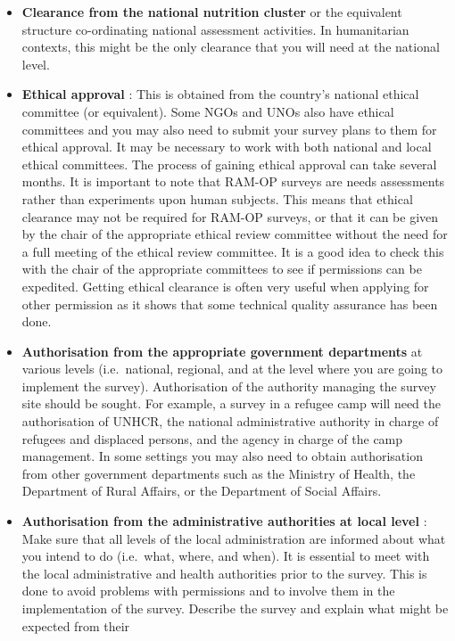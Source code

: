 \documentclass[12pt,a4paper]{book}
\theoremstyle{definition}
\theoremstyle{definition}
\theoremstyle{definition}
\theoremstyle{remark}
\begin{document}
\begin{itemize}
\item
  \textbf{Clearance from the national nutrition cluster} or the
  equivalent structure co-ordinating national assessment activities. In
  humanitarian contexts, this might be the only clearance that you will
  need at the national level.
\item
  \textbf{Ethical approval} : This is obtained from the country's
  national ethical committee (or equivalent). Some NGOs and UNOs also
  have ethical committees and you may also need to submit your survey
  plans to them for ethical approval. It may be necessary to work with
  both national and local ethical committees. The process of gaining
  ethical approval can take several months. It is important to note that
  RAM-OP surveys are needs assessments rather than experiments upon
  human subjects. This means that ethical clearance may not be required
  for RAM-OP surveys, or that it can be given by the chair of the
  appropriate ethical review committee without the need for a full
  meeting of the ethical review committee. It is a good idea to check
  this with the chair of the appropriate committees to see if
  permissions can be expedited. Getting ethical clearance is often very
  useful when applying for other permission as it shows that some
  technical quality assurance has been done.
\item
  \textbf{Authorisation from the appropriate government departments} at
  various levels (i.e.~national, regional, and at the level where you
  are going to implement the survey). Authorisation of the authority
  managing the survey site should be sought. For example, a survey in a
  refugee camp will need the authorisation of UNHCR, the national
  administrative authority in charge of refugees and displaced persons,
  and the agency in charge of the camp management. In some settings you
  may also need to obtain authorisation from other government
  departments such as the Ministry of Health, the Department of Rural
  Affairs, or the Department of Social Affairs.
\item
  \textbf{Authorisation from the administrative authorities at local
  level} : Make sure that all levels of the local administration are
  informed about what you intend to do (i.e.~what, where, and when). It
  is essential to meet with the local administrative and health
  authorities prior to the survey. This is done to avoid problems with
  permissions and to involve them in the implementation of the survey.
  Describe the survey and explain what might be expected from their

\end{itemize}
\end{document}
